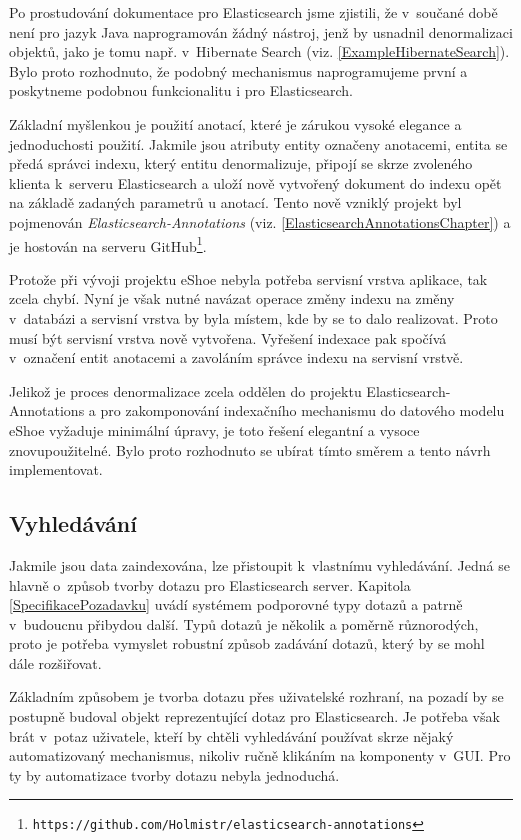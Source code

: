 \documentclass[11pt,oneside]{fithesis2}
\begin{document}
Po prostudování dokumentace pro Elasticsearch jsme zjistili, že v~součané době není pro jazyk Java naprogramován žádný nástroj, jenž by usnadnil denormalizaci objektů, jako je tomu např. v~Hibernate Search (viz. \ref{ExampleHibernateSearch}). Bylo proto rozhodnuto, že podobný mechanismus naprogramujeme první a poskytneme podobnou funkcionalitu i pro Elasticsearch.

Základní myšlenkou je použití anotací, které je zárukou vysoké elegance a jednoduchosti použití. Jakmile jsou atributy entity označeny anotacemi, entita se předá správci indexu, který entitu denormalizuje, připojí se skrze zvoleného klienta k~serveru Elasticsearch a uloží nově vytvořený dokument do indexu opět na základě zadaných parametrů u anotací. Tento nově vzniklý projekt byl pojmenován \emph{Elasticsearch-Annotations} (viz. \ref{ElasticsearchAnnotationsChapter}) a je hostován na serveru GitHub\footnote{\texttt{https://github.com/Holmistr/elasticsearch-annotations}}.

Protože při vývoji projektu eShoe nebyla potřeba servisní vrstva aplikace, tak zcela chybí. Nyní je však nutné navázat operace změny indexu na změny v~databázi a servisní vrstva by byla místem, kde by se to dalo realizovat. Proto musí být servisní vrstva nově vytvořena. Vyřešení indexace pak spočívá v~označení entit anotacemi a zavoláním správce indexu na servisní vrstvě. 

Jelikož je proces denormalizace zcela oddělen do projektu Elasticsearch-Annotations a pro zakomponování indexačního mechanismu do datového modelu eShoe vyžaduje minimální úpravy, je toto řešení elegantní a vysoce znovupoužitelné. Bylo proto rozhodnuto se ubírat tímto směrem a tento návrh implementovat.

\subsection{Vyhledávání}
Jakmile jsou data zaindexována, lze přistoupit k~vlastnímu vyhledávání. Jedná se hlavně o~způsob tvorby dotazu pro Elasticsearch server. Kapitola \ref{SpecifikacePozadavku} uvádí systémem podporovné typy dotazů a patrně v~budoucnu přibydou další. Typů dotazů je několik a poměrně různorodých, proto je potřeba vymyslet robustní způsob zadávání dotazů, který by se mohl dále rozšiřovat.

Základním způsobem je tvorba dotazu přes uživatelské rozhraní, na pozadí by se postupně budoval objekt reprezentující dotaz pro Elasticsearch. Je potřeba však brát v~potaz uživatele, kteří by chtěli vyhledávání používat skrze nějaký automatizovaný mechanismus, nikoliv ručně klikáním na komponenty v~GUI. Pro ty by automatizace tvorby dotazu nebyla jednoduchá.
\end{document}
